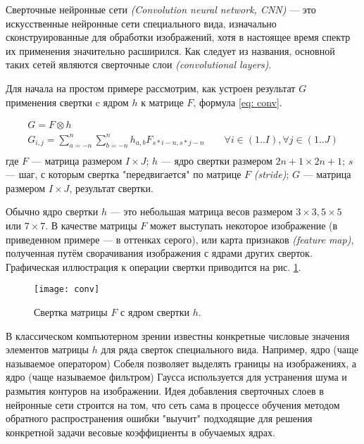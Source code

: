 \indent
\indent
Сверточные нейронные сети \textit{(Convolution neural network, CNN)} --- 
это искусственные нейронные сети специального вида,
изначально сконструированные для 
обработки изображений, хотя в настоящее время спектр их применения 
значительно расширился. Как следует из названия, основной таких сетей 
являются сверточные слои \textit{(convolutional layers)}.

\indent
\indent
 Для начала на простом примере рассмотрим,
 как устроен результат $G$ применения свертки c ядром $h$ 
 к матрице  $F$, формула \ref{eq: conv}. 

\begin{equation}\label{eq: conv}
    \begin{gathered}
        G = F \otimes h \\
	    G_{i, j} = \sum_{a=-n}^{n} \sum_{b=-n}^{n} h_{a, b} F_{s*i - n, s*j - n} \qquad
	    \forall i \in (1..I), \forall j \in (1..J) \\
    \end{gathered}
\end{equation}
где $F$ --- матрица размером $I \times J$;
$h$ --- ядро свертки размером $2n+1 \times 2n+1$;
$s$ --- шаг, с которым свертка "передвигается" по матрице $F$ \textit{(stride)};
$G$ --- матрица размером $I \times J$, результат свертки.

\indent
\indent
Обычно ядро свертки $h$ --- это небольшая матрица весов размером
 $3\times3, 5\times5$ или $7\times7$. В качестве матрицы $F$ может выступать
 некоторое изображение (в приведенном примере --- в оттенках серого),
  или карта признаков \textit{(feature map)}, полученная 
путём сворачивания изображения с ядрами других сверток.
Графическая иллюстрация
к операции свертки приводится на рис. \ref{tikzpicture: conv}.


\begin{figure}[h!]
    \begin{center}
   	    \texttt{[image: conv]}
   	\end{center}
   	\caption{Свертка матрицы $F$ с ядром свертки $h$.}
   	\label{tikzpicture: conv}
\end{figure}


\indent
\indent
В классическом компьютерном зрении известны конкретные числовые
значения элементов матрицы $h$ для ряда сверток 
специального вида. Например, ядро (чаще называемое оператором) Собеля 
позволяет выделять границы на изображениях, а ядро (чаще
называемое фильтром) Гаусса используется для устранения шума
и размытия контуров на изображении. Идея добавления сверточных слоев в 
 нейронные сети строится на том, что сеть сама в процессе
обучения методом обратного распространения ошибки "выучит" подходящие
для решения конкретной задачи весовые коэффициенты в обучаемых ядрах.

